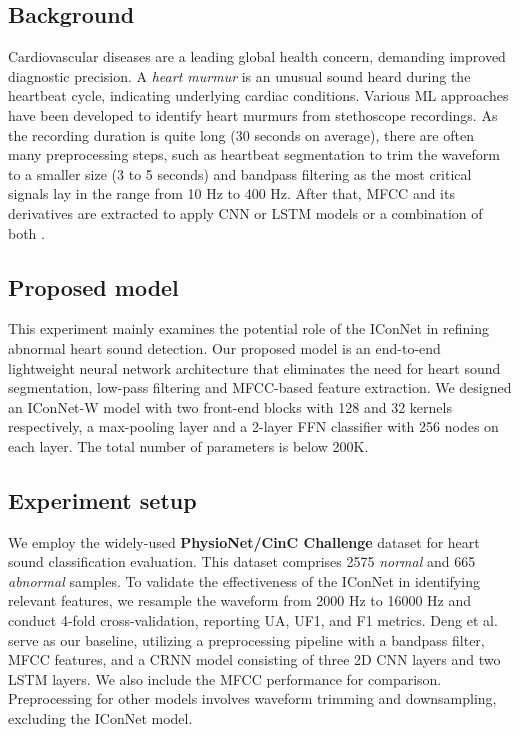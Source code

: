 {\subsection{Background}
Cardiovascular diseases are a leading global health concern, demanding improved diagnostic precision. A \textit{heart murmur} is an unusual sound heard during the heartbeat cycle, indicating underlying cardiac conditions. Various ML approaches have been developed to identify heart murmurs from stethoscope recordings. As the recording duration is quite long (30 seconds on average), there are often many preprocessing steps, such as heartbeat segmentation to trim the waveform to a smaller size (3 to 5 seconds) and bandpass filtering as the most critical signals lay in the range from 10 Hz to 400 Hz. After that, MFCC and its derivatives are extracted to apply CNN or LSTM models or a combination of both \cite{li2021lightweight, li2022heart}.

\subsection{Proposed model}
This experiment mainly examines the potential role of the IConNet in refining abnormal heart sound detection. Our proposed model is an end-to-end lightweight neural network architecture that eliminates the need for heart sound segmentation, low-pass filtering and MFCC-based feature extraction. We designed an IConNet-W model with two front-end blocks with 128 and 32 kernels respectively, a max-pooling layer and a 2-layer FFN classifier with 256 nodes on each layer. The total number of parameters is below 200K.

\subsection{Experiment setup}
We employ the widely-used \textbf{PhysioNet/CinC Challenge} dataset \cite{liu2016physionet} for heart sound classification evaluation. This dataset comprises 2575 \textit{normal} and 665 \textit{abnormal} samples. To validate the effectiveness of the IConNet in identifying relevant features, we resample the waveform from 2000 Hz to 16000 Hz and conduct 4-fold cross-validation, reporting UA, UF1, and F1 metrics. Deng et al.\cite{deng2020heart} serve as our baseline, utilizing a preprocessing pipeline with a bandpass filter, MFCC features, and a CRNN model consisting of three 2D CNN layers and two LSTM layers. We also include the MFCC performance for comparison. Preprocessing for other models involves waveform trimming and downsampling, excluding the IConNet model.

}

